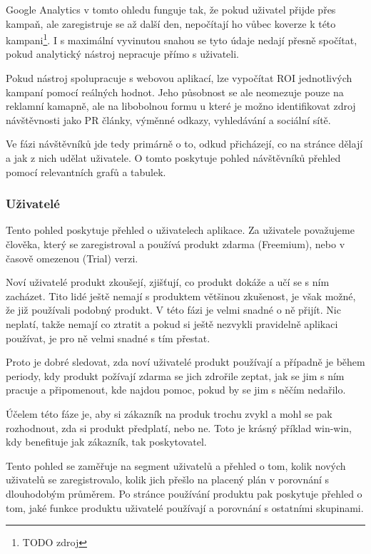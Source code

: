 \documentclass[bc,female,java,dept456]{diploma}						%
\begin{document}
Google Analytics v tomto ohledu funguje tak, že pokud uživatel přijde přes kampaň, ale zaregistruje se až další den, nepočítají ho vůbec koverze k této kampani\footnote{TODO zdroj}. I s maximální vyvinutou snahou se tyto údaje nedají přesně spočítat, pokud analytický nástroj nepracuje přímo s uživateli.

Pokud nástroj spolupracuje s webovou aplikací, lze vypočítat ROI jednotlivých kampaní pomocí reálných hodnot. Jeho působnost se ale neomezuje pouze na reklamní kamapně, ale na libobolnou formu u které je možno identifikovat zdroj návštěvnosti jako PR články, výměnné odkazy, vyhledávání a sociální sítě.

\bigskip

Ve fázi návštěvníků jde tedy primárně o to, odkud přicházejí, co na stránce dělají a jak z nich udělat uživatele. O tomto poskytuje pohled návštěvníků přehled pomocí relevantních grafů a tabulek.




\subsubsection{Uživatelé}

Tento pohled poskytuje přehled o uživatelech aplikace. Za uživatele považujeme člověka, který se zaregistroval a používá produkt zdarma (Freemium), nebo v časově omezenou (Trial) verzi.

Noví uživatelé produkt zkoušejí, zjišťují, co produkt dokáže a učí se s ním zacházet. Tito lidé ještě nemají s  produktem většinou zkušenost, je však možné, že již používali podobný produkt. V této fázi je velmi snadné o ně přijít. Nic neplatí, takže nemají co ztratit a pokud si ještě nezvykli pravidelně aplikaci používat, je pro ně velmi snadné s tím přestat. 

Proto je dobré sledovat, zda noví uživatelé produkt používají a případně je během periody, kdy produkt požívají zdarma se jich zdrořile zeptat, jak se jim s ním pracuje a připomenout, kde najdou pomoc, pokud by se jim s něčím nedařilo.

Účelem této fáze je, aby si zákazník na produk trochu zvykl a mohl se pak rozhodnout, zda si produkt předplatí, nebo ne. Toto je krásný příklad win-win, kdy benefituje jak zákazník, tak poskytovatel.

Tento pohled se zaměřuje na segment uživatelů a přehled o tom, kolik nových uživatelů se zaregistrovalo, kolik jich přešlo na placený plán v porovnání s dlouhodobým průměrem. Po stránce používání produktu pak poskytuje přehled o tom, jaké funkce produktu uživatelé používají a porovnání s ostatními skupinami.
\end{document}
